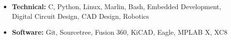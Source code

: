 \documentclass[
	10pt, %
]{FreemanCV}
\begin{document}
\begin{paracol}{2}
\begin{itemize}[leftmargin=10pt]
	\itemsep0pt
	\item \textbf{Technical:} C, Python, Linux, Marlin, Bash, Embedded Development,\\
	\hspace*{45pt}Digital Circuit Design, CAD Design, Robotics
	\item \textbf{Software:} Git, Sourcetree, Fusion 360, KiCAD, Eagle, MPLAB X, XC8
\end{itemize}







	
	
	
	

\end{paracol}
\end{document}
